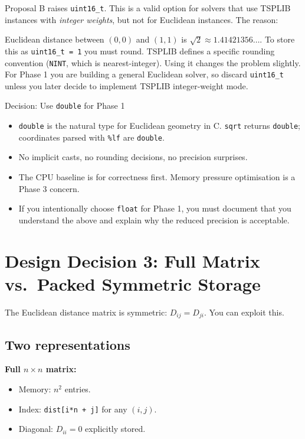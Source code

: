 Proposal B raises \texttt{uint16\_t}. This is a valid option for solvers that use TSPLIB instances with \emph{integer weights}, but not for Euclidean instances. The reason:

Euclidean distance between $(0,0)$ and $(1,1)$ is $\sqrt{2} \approx 1.41421356\ldots$. To store this as \texttt{uint16\_t = 1} you must round. TSPLIB defines a specific rounding convention (\texttt{NINT}, which is nearest-integer). Using it changes the problem slightly. For Phase 1 you are building a general Euclidean solver, so discard \texttt{uint16\_t} unless you later decide to implement TSPLIB integer-weight mode.

\begin{goodbox}{Decision: Use \texttt{double} for Phase 1}
\begin{itemize}
  \item \texttt{double} is the natural type for Euclidean geometry in C. \texttt{sqrt} returns \texttt{double}; coordinates parsed with \texttt{\%lf} are \texttt{double}.
  \item No implicit casts, no rounding decisions, no precision surprises.
  \item The CPU baseline is for correctness first. Memory pressure optimisation is a Phase 3 concern.
  \item If you intentionally choose \texttt{float} for Phase 1, you must document that you understand the above and explain why the reduced precision is acceptable.
\end{itemize}
\end{goodbox}

\newpage

\section{Design Decision 3: Full Matrix vs.\ Packed Symmetric Storage}

The Euclidean distance matrix is symmetric: $D_{ij} = D_{ji}$. You can exploit this.

\subsection{Two representations}

\textbf{Full $n \times n$ matrix:}
\begin{itemize}
  \item Memory: $n^2$ entries.
  \item Index: \texttt{dist[i*n + j]} for any $(i, j)$.
  \item Diagonal: $D_{ii} = 0$ explicitly stored.
\end{itemize}

